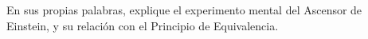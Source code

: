
\question[1] 
En sus propias palabras, explique el experimento mental del Ascensor de
Einstein, y su relación con el Principio de Equivalencia.

\droptotalpoints

